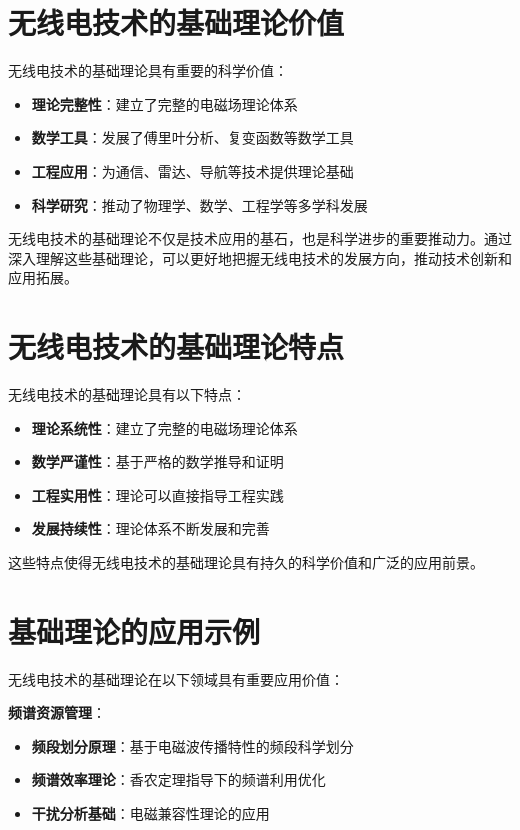 \documentclass[12pt,UTF8]{ctexbook}
\begin{document}
\section{无线电技术的基础理论价值}

无线电技术的基础理论具有重要的科学价值：

\begin{itemize}[leftmargin=3.5em]
    \item \textbf{理论完整性}：建立了完整的电磁场理论体系
    \item \textbf{数学工具}：发展了傅里叶分析、复变函数等数学工具
    \item \textbf{工程应用}：为通信、雷达、导航等技术提供理论基础
    \item \textbf{科学研究}：推动了物理学、数学、工程学等多学科发展
\end{itemize}

无线电技术的基础理论不仅是技术应用的基石，也是科学进步的重要推动力。通过深入理解这些基础理论，可以更好地把握无线电技术的发展方向，推动技术创新和应用拓展。

\section{无线电技术的基础理论特点}

无线电技术的基础理论具有以下特点：

\begin{itemize}[leftmargin=3.5em]
    \item \textbf{理论系统性}：建立了完整的电磁场理论体系
    \item \textbf{数学严谨性}：基于严格的数学推导和证明
    \item \textbf{工程实用性}：理论可以直接指导工程实践
    \item \textbf{发展持续性}：理论体系不断发展和完善
\end{itemize}

这些特点使得无线电技术的基础理论具有持久的科学价值和广泛的应用前景。

\section{基础理论的应用示例}

无线电技术的基础理论在以下领域具有重要应用价值：

\textbf{频谱资源管理}：
\begin{itemize}[leftmargin=3.5em]
    \item \textbf{频段划分原理}：基于电磁波传播特性的频段科学划分
    \item \textbf{频谱效率理论}：香农定理指导下的频谱利用优化
    \item \textbf{干扰分析基础}：电磁兼容性理论的应用
\end{itemize}
\end{document}
